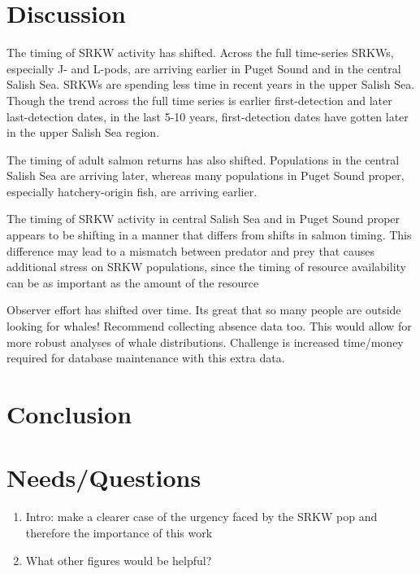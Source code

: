 \documentclass{article}
\begin{document}
\section*{Discussion}
\par The timing of SRKW activity has shifted. Across the full time-series SRKWs, especially J- and L-pods, are arriving earlier in Puget Sound and in the central Salish Sea. SRKWs are spending less time in recent years in the upper Salish Sea. Though the trend across the full time series is earlier first-detection and later last-detection dates, in the last 5-10 years, first-detection dates have gotten later in the upper Salish Sea region.
\par The timing of adult salmon returns has also shifted. Populations in the central Salish Sea are arriving later, whereas many populations in Puget Sound proper, especially hatchery-origin fish, are arriving earlier. 
\par The timing of SRKW activity in central Salish Sea and in Puget Sound proper appears to be shifting in a manner that differs from shifts in salmon timing. This difference may lead to a mismatch between predator and prey that causes additional stress on SRKW populations, since the timing of resource availability can be as important as the amount of the resource \citep[Brianna's work,][]{hipfner2008}
\par Observer effort has shifted over time. Its great that so many people are outside looking for whales! Recommend collecting absence data too. This would allow for more robust analyses of whale distributions. Challenge is increased time/money required for database maintenance with this extra data.

\section*{Conclusion}

\section*{Needs/Questions}

\begin{enumerate}
\item Intro: make a clearer case of the urgency faced by the SRKW pop and therefore the importance of this work

\item What other figures would be helpful?
\end{enumerate}
\end{document}
